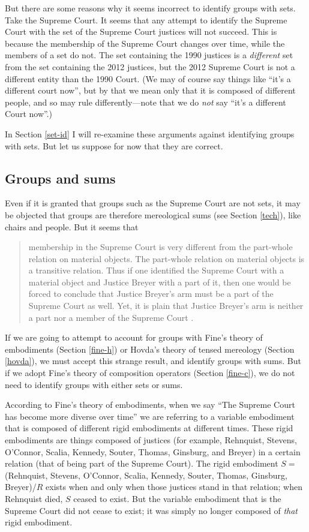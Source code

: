 \documentclass[12pt,twoside]{reedfancy}
\begin{document}
\begin{spacing}{1.25}
But there are some reasons why it seems incorrect to identify groups
with sets.  Take the Supreme Court.  It seems that any attempt to
identify the Supreme Court with the set of the Supreme Court justices
will not succeed.  This is because the membership of the Supreme Court
changes over time, while the members of a set do not.  The set
containing the 1990 justices is a {\em different} set from the set
containing the 2012 justices, but the 2012 Supreme Court is not a
different entity than the 1990 Court.  (We may of course say things
like ``it's a different court now'', but by that we mean only that it
is composed of different people, and so may rule differently---note
that we do {\em not} say ``it's a different Court now''.)

In Section \ref{set-id} I will re-examine these arguments against
identifying groups with sets.  But let us suppose for now that they
are correct.

\subsection{Groups and sums}
\label{group-sum}
Even if it is granted that groups such as the Supreme Court are not
sets, it may be objected that groups are therefore mereological sums
(see Section \ref{tech}), like chairs and people.  But it seems that

\begin{quote}
membership in the Supreme Court is very different from
the part-whole relation on material objects.  The part-whole relation
on material objects is a transitive relation.  Thus if one identified
the Supreme Court with a material object and Justice Breyer with a
part of it, then one would be forced to conclude that Justice Breyer's
arm must be a part of the Supreme Court as well.  Yet, it is plain
that Justice Breyer's arm is neither a part nor a member of the
Supreme Court \citep[136--137]{uzquiano2004a}.
\end{quote}

If we are going to attempt to account for groups with Fine's theory of
embodiments (Section \ref{fine-h}) or Hovda's theory of tensed
mereology (Section \ref{hovda}), we must accept this strange result,
and identify groups with sums.  But if we adopt Fine's theory of
composition operators (Section \ref{fine-c}), we do not need to
identify groups with either sets or sums.

According to Fine's theory of embodiments, when we say ``The Supreme
Court has become more diverse over time'' we are referring to a
variable embodiment that is composed of different rigid embodiments at
different times.  These rigid embodiments are things composed of
justices (for example, Rehnquist, Stevens, O'Connor, Scalia, Kennedy,
Souter, Thomas, Ginsburg, and Breyer) in a certain relation (that of
being part of the Supreme Court).  The rigid embodiment $S =$
(Rehnquist, Stevens, O'Connor, Scalia, Kennedy, Souter, Thomas,
Ginsburg, Breyer)/$R$ exists when and only when those justices stand
in that relation; when Rehnquist died, $S$ ceased to exist.  But the
variable embodiment that is the Supreme Court did not cease to exist;
it was simply no longer composed of {\em that} rigid embodiment.


\end{spacing}
\end{document}
